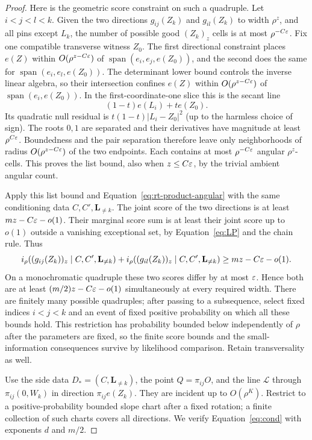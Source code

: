 \begin{proof}
Here is the geometric score constraint on such a quadruple.
Let $i<j<l<k$.  Given the two directions
$g_{ij}(Z_k)$ and $g_{il}(Z_k)$ to width $\rho^z$, and all
pins except $L_k$, the number of possible good $(Z_k)_z$ cells
is at most $\rho^{-C\varepsilon}$.  Fix one compatible transverse
witness $Z_0$.  The first directional constraint places $e(Z)$
within $O(\rho^{z-C\varepsilon})$ of
$\operatorname{span}(e_i,e_j,e(Z_0))$, and the second does the
same for $\operatorname{span}(e_i,e_l,e(Z_0))$.
The determinant lower bound controls the inverse linear algebra,
so their intersection confines $e(Z)$ within
$O(\rho^{z-C\varepsilon})$ of
$\operatorname{span}(e_i,e(Z_0))$.
In the first-coordinate-one slice this is the secant line
\[
 (1-t)e(L_i)+t e(Z_0).
\]
Its quadratic null residual is
$t(1-t)|L_i-Z_0|^2$ (up to the harmless choice of sign).
The roots $0,1$ are separated and their derivatives have magnitude
at least $\rho^{C\varepsilon}$.  Boundedness and the pair separation
therefore leave only neighborhoods of radius
$O(\rho^{z-C\varepsilon})$ of the two endpoints.  Each contains at
most $\rho^{-C\varepsilon}$ angular $\rho^z$-cells.
This proves the list bound, also when $z\le C\varepsilon$, by the
trivial ambient angular count.

Apply this list bound and Equation~\eqref{eq:rt-product-angular}
with the same conditioning data $C,C',\mathbf L_{\ne k}$.
The joint score of the two directions is at least
$mz-C\varepsilon-o(1)$.  Their marginal score sum is at least their
joint score up to $o(1)$ outside a vanishing exceptional set,
by Equation~\eqref{eq:LP} and the chain rule.  Thus
\begin{equation}\label{eq:rt-two-directions}
 i_\rho((g_{ij}(Z_k))_z\mid C,C',\mathbf L_{\ne k})
 +i_\rho((g_{il}(Z_k))_z\mid C,C',\mathbf L_{\ne k})
 \ge mz-C\varepsilon-o(1).
\end{equation}
On a monochromatic quadruple these two scores differ by at most
$\varepsilon$.  Hence both are at least
$(m/2)z-C\varepsilon-o(1)$ simultaneously at every required width.
There are finitely many possible quadruples; after passing to a
subsequence, select fixed indices $i<j<k$ and an event of fixed
positive probability on which all these
bounds hold.  This restriction has probability bounded below
independently of $\rho$ after the parameters are fixed, so the
finite score bounds and the small-information consequences survive
by likelihood comparison.  Retain transversality as well.

Use the side data $D_*=(C,\mathbf L_{\ne k})$, the point
$Q=\pi_{ij}O$, and the line $\mathcal L$ through
$\pi_{ij}(0,W_k)$ in direction $\pi_{ij}e(Z_k)$.
They are incident up to $O(\rho^K)$.  Restrict to a
positive-probability bounded slope chart after a fixed rotation;
a finite collection of such charts covers all directions.  We
verify Equation~\eqref{eq:cond} with exponents $d$ and $m/2$.


\end{proof}

